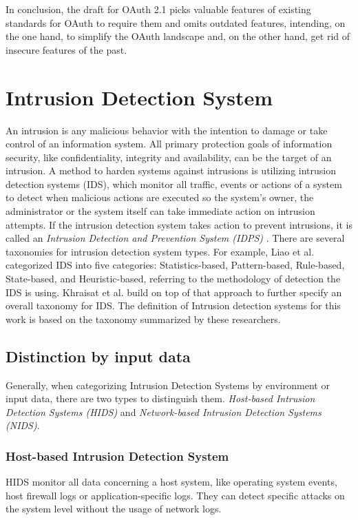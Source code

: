 In conclusion, the draft for OAuth 2.1 picks valuable features of existing standards for OAuth to require them and omits outdated features, intending, on the one hand, to simplify the OAuth landscape and, on the other hand, get rid of insecure features of the past.

\section{Intrusion Detection System}
An intrusion is any malicious behavior with the intention to damage or take control of an information system. All primary protection goals of information security, like confidentiality, integrity and availability, can be the target of an intrusion. A method to harden systems against intrusions is utilizing intrusion detection systems (IDS), which monitor all traffic, events or actions of a system to detect when malicious actions are executed so the system's owner, the administrator or the system itself can take immediate action on intrusion attempts. If the intrusion detection system takes action to prevent intrusions, it is called an \emph{Intrusion Detection and Prevention System (IDPS)} \cite{scarfone2010intrusion}. There are several taxonomies for intrusion detection system types. For example, Liao et al. \cite{Liao2013IntrusionDS} categorized IDS into five categories: Statistics-based, Pattern-based, Rule-based, State-based, and Heuristic-based, referring to the methodology of detection the IDS is using. Khraisat et al. \cite{khraisat2019survey} build on top of that approach to further specify an overall taxonomy for IDS. The definition of Intrusion detection systems for this work is based on the taxonomy summarized by these researchers.

\subsection{Distinction by input data}
Generally, when categorizing Intrusion Detection Systems by environment or input data, there are two types to distinguish them. 
\emph{Host-based Intrusion Detection Systems (HIDS)} and \emph{Network-based Intrusion Detection Systems (NIDS)}.
\subsubsection{Host-based Intrusion Detection System}
HIDS monitor all data concerning a host system, like operating system events, host firewall logs or application-specific logs. They can detect specific attacks on the system level without the usage of network logs.
